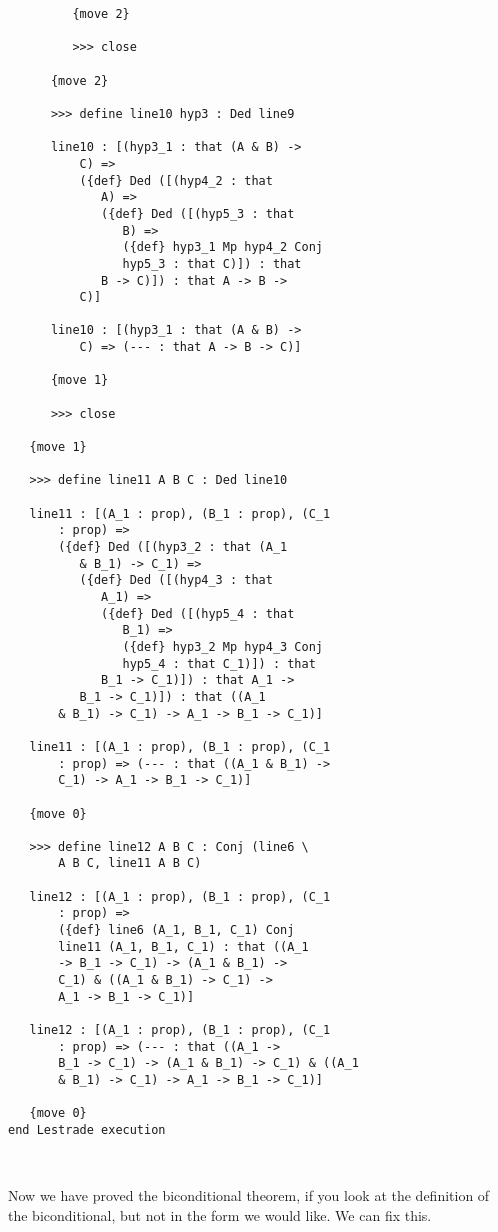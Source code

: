 \documentclass[12pt]{article}
\begin{document}
\begin{verbatim}
         {move 2}

         >>> close

      {move 2}

      >>> define line10 hyp3 : Ded line9

      line10 : [(hyp3_1 : that (A & B) -> 
          C) => 
          ({def} Ded ([(hyp4_2 : that 
             A) => 
             ({def} Ded ([(hyp5_3 : that 
                B) => 
                ({def} hyp3_1 Mp hyp4_2 Conj 
                hyp5_3 : that C)]) : that 
             B -> C)]) : that A -> B -> 
          C)]

      line10 : [(hyp3_1 : that (A & B) -> 
          C) => (--- : that A -> B -> C)]

      {move 1}

      >>> close

   {move 1}

   >>> define line11 A B C : Ded line10

   line11 : [(A_1 : prop), (B_1 : prop), (C_1 
       : prop) => 
       ({def} Ded ([(hyp3_2 : that (A_1 
          & B_1) -> C_1) => 
          ({def} Ded ([(hyp4_3 : that 
             A_1) => 
             ({def} Ded ([(hyp5_4 : that 
                B_1) => 
                ({def} hyp3_2 Mp hyp4_3 Conj 
                hyp5_4 : that C_1)]) : that 
             B_1 -> C_1)]) : that A_1 -> 
          B_1 -> C_1)]) : that ((A_1 
       & B_1) -> C_1) -> A_1 -> B_1 -> C_1)]

   line11 : [(A_1 : prop), (B_1 : prop), (C_1 
       : prop) => (--- : that ((A_1 & B_1) -> 
       C_1) -> A_1 -> B_1 -> C_1)]

   {move 0}

   >>> define line12 A B C : Conj (line6 \
       A B C, line11 A B C)

   line12 : [(A_1 : prop), (B_1 : prop), (C_1 
       : prop) => 
       ({def} line6 (A_1, B_1, C_1) Conj 
       line11 (A_1, B_1, C_1) : that ((A_1 
       -> B_1 -> C_1) -> (A_1 & B_1) -> 
       C_1) & ((A_1 & B_1) -> C_1) -> 
       A_1 -> B_1 -> C_1)]

   line12 : [(A_1 : prop), (B_1 : prop), (C_1 
       : prop) => (--- : that ((A_1 -> 
       B_1 -> C_1) -> (A_1 & B_1) -> C_1) & ((A_1 
       & B_1) -> C_1) -> A_1 -> B_1 -> C_1)]

   {move 0}
end Lestrade execution



\end{verbatim}

Now we have proved the biconditional theorem, if you look at the definition of the biconditional, but not in the form we would like.
We can fix this.
\end{document}
